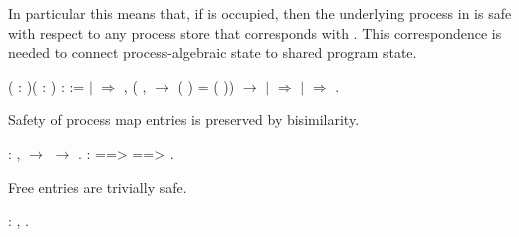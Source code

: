 \documentclass[12pt]{report}
\begin{document}
 In particular this means that, if  is occupied,
    then the underlying process in  is safe with respect
    to any process store that corresponds with . This
    correspondence is needed to connect process-algebraic
    state to shared program state. \begin{coqdoccode}
\coqdocemptyline
\coqdocnoindent
{}  ( : )( : ) :  :=\coqdoceol
\coqdocindent{1.00em}
  \coqdoceol
\coqdocindent{2.00em}
\ensuremath{|}  \coqdocvar{\_}    \ensuremath{\Rightarrow}\coqdoceol
\coqdocindent{4.00em}
\coqdockw{\ensuremath{\forall}} ,\coqdoceol
\coqdocindent{5.00em}
(\coqdockw{\ensuremath{\forall}} ,    \ensuremath{\rightarrow}  ( ) =  ( )) \ensuremath{\rightarrow}\coqdoceol
\coqdocindent{4.00em}
  \coqdoceol
\coqdocindent{2.00em}
\ensuremath{|}  \ensuremath{\Rightarrow} \coqdoceol
\coqdocindent{2.00em}
\ensuremath{|}  \ensuremath{\Rightarrow} \coqdoceol
\coqdocindent{1.00em}
.\coqdoceol
\coqdocemptyline
\end{coqdoccode}
Safety of process map entries is preserved by bisimilarity. \begin{coqdoccode}
\coqdocemptyline
\coqdocnoindent
{}  :\coqdoceol
\coqdocindent{1.00em}
\coqdockw{\ensuremath{\forall}}   ,\coqdoceol
\coqdocindent{1.00em}
   \ensuremath{\rightarrow}    \ensuremath{\rightarrow}   .\coqdoceol
\coqdocnoindent
{}   : \coqdoceol
\coqdocindent{1.00em}
   ==>  ==> \coqdoceol
\coqdocindent{2.00em}
 .\coqdoceol
\coqdocemptyline
\end{coqdoccode}
Free entries are trivially safe. \begin{coqdoccode}
\coqdocemptyline
\coqdocnoindent
{}  :\coqdoceol
\coqdocindent{1.00em}
\coqdockw{\ensuremath{\forall}} ,   .\coqdoceol
 \coqdocemptyline
\end{coqdoccode}
\end{document}
